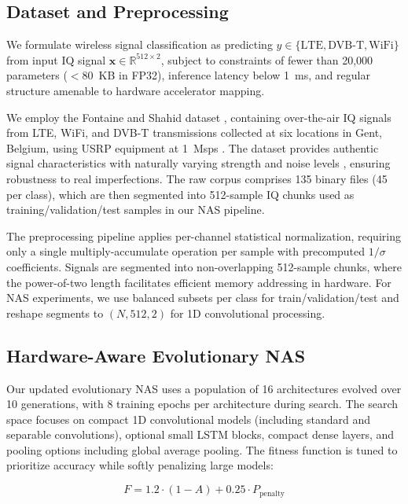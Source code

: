 \documentclass[conference]{IEEEtran}
\begin{document}
\subsection{Dataset and Preprocessing}

We formulate wireless signal classification as predicting $y \in \{\text{LTE}, \text{DVB-T}, \text{WiFi}\}$ from input IQ signal $\mathbf{x} \in \mathbb{R}^{512 \times 2}$, subject to constraints of fewer than 20,000 parameters ($<$80~KB in FP32), inference latency below 1~ms, and regular structure amenable to hardware accelerator mapping.

We employ the Fontaine and Shahid dataset \cite{fontaine2023dataset}, containing over-the-air IQ signals from LTE, WiFi, and DVB-T transmissions collected at six locations in Gent, Belgium, using USRP equipment at 1~Msps \cite{fontaine2023github}. The dataset provides authentic signal characteristics with naturally varying strength and noise levels \cite{fontaine2019low}, ensuring robustness to real imperfections. The raw corpus comprises 135 binary files (45 per class), which are then segmented into 512-sample IQ chunks used as training/validation/test samples in our NAS pipeline.

The preprocessing pipeline applies per-channel statistical normalization, requiring only a single multiply-accumulate operation per sample with precomputed $1/\sigma$ coefficients. Signals are segmented into non-overlapping 512-sample chunks, where the power-of-two length facilitates efficient memory addressing in hardware. For NAS experiments, we use balanced subsets per class for train/validation/test and reshape segments to $(N, 512, 2)$ for 1D convolutional processing.

\subsection{Hardware-Aware Evolutionary NAS}

Our updated evolutionary NAS uses a population of 16 architectures evolved over 10 generations, with 8 training epochs per architecture during search. The search space focuses on compact 1D convolutional models (including standard and separable convolutions), optional small LSTM blocks, compact dense layers, and pooling options including global average pooling. The fitness function is tuned to prioritize accuracy while softly penalizing large models:

\begin{equation}
F = 1.2 \cdot (1-A) + 0.25 \cdot P_{\mathrm{penalty}}
\label{eq:fitness}
\end{equation}
\end{document}
